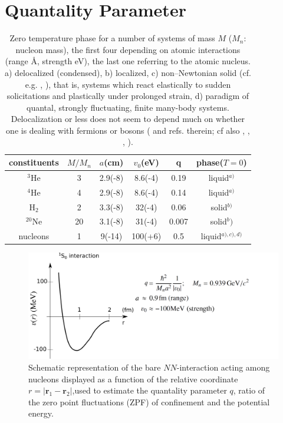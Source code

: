 \section{Quantality Parameter}\label{App1A}
\begin{table}
 \begin{tabular}{|c|c|c|c|c|c|}
 \hline \rule[-2ex]{0pt}{5.5ex}   constituents& $M/M_n$  & $a$(cm) &$v_0$(eV)  &q&phase($T=0$)    \\ 
 \hline \rule[-2ex]{0pt}{5.5ex}   $^{3}$He &3& 2.9(-8)  &8.6(-4)  &0.19  &liquid$^{a)}$    \\ 
 \hline \rule[-2ex]{0pt}{5.5ex}  $^{4}$He  &4&  2.9(-8)&  8.6(-4)&  0.14& liquid$^{a)}$   \\ 
 \hline \rule[-2ex]{0pt}{5.5ex}    H$_2$&2&  3.3(-8)&  32(-4)&  0.06&solid$^{b)}$   \\ 
 \hline \rule[-2ex]{0pt}{5.5ex}    $^{20}$Ne&20& 3.1(-8) &  31(-4)&  0.007&solid$^b)$    \\ 
 \hline \rule[-2ex]{0pt}{5.5ex}    nucleons&1&  9(-14)& 100(+6) &  0.5&liquid$^{a),c),d)}$  \\ 
 \hline 
 \end{tabular}
 \caption{Zero temperature phase for a number of systems of mass $M$ ($M_n$: nucleon mass), the first four depending on atomic interactions (range \AA, strength eV), the last one referring to the atomic nucleus. a) delocalized (condensed), b) localized, c) non--Newtonian solid (cf. e.g. \cite{Bertsch:88b}, \cite{DeGennes:94}), that is, systems which react elastically to sudden solicitations and plastically under prolonged strain, d) paradigm of quantal, strongly fluctuating, finite many-body  systems. Delocalization or less does not seem to depend much on whether one is dealing with fermions or bosons (\cite{Mottelson:02} and refs. therein; cf also \cite{Ebran:14}, \cite{Ebran:14b}, \cite{Ebran:13}, \cite{Ebran:12}).}\label{tab1A1}
 \end{table}
 \begin{figure}
 \centerline{\includegraphics*[width=13cm,angle=0]{nutshell/figs/potential.pdf}}
 \caption[Bare $NN$-interaction.]{Schematic representation of the bare $NN$-interaction acting among nucleons displayed as a function of the relative coordinate $r=|\mathbf{r}_1-\mathbf{r}_2|$,used to estimate the quantality parameter $q$, ratio of the zero point fluctuations (ZPF) of confinement and the potential energy.}\label{fig1A1}
 \end{figure}
